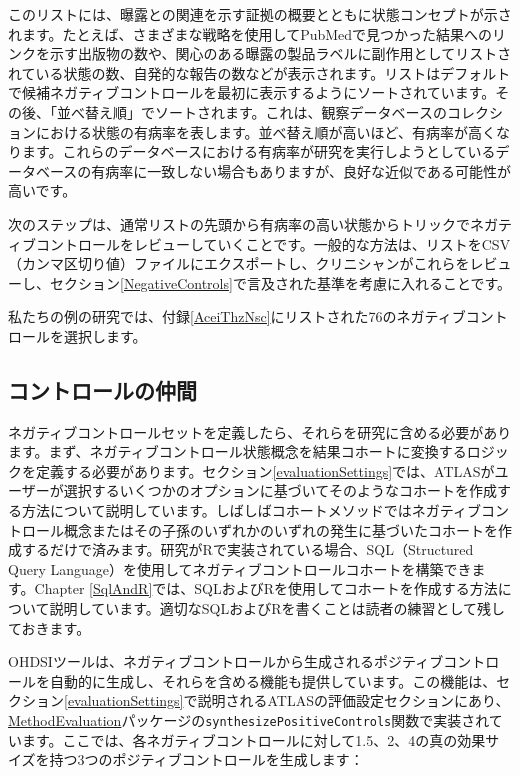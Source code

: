 \documentclass[
  11pt]{book}
\theoremstyle{definition}
\theoremstyle{definition}
\theoremstyle{definition}
\theoremstyle{definition}
\theoremstyle{remark}
\begin{document}
このリストには、曝露との関連を示す証拠の概要とともに状態コンセプトが示されます。たとえば、さまざまな戦略を使用してPubMedで見つかった結果へのリンクを示す出版物の数や、関心のある曝露の製品ラベルに副作用としてリストされている状態の数、自発的な報告の数などが表示されます。リストはデフォルトで候補ネガティブコントロールを最初に表示するようにソートされています。その後、「並べ替え順」でソートされます。これは、観察データベースのコレクションにおける状態の有病率を表します。並べ替え順が高いほど、有病率が高くなります。これらのデータベースにおける有病率が研究を実行しようとしているデータベースの有病率に一致しない場合もありますが、良好な近似である可能性が高いです。

次のステップは、通常リストの先頭から有病率の高い状態からトリックでネガティブコントロールをレビューしていくことです。一般的な方法は、リストをCSV（カンマ区切り値）ファイルにエクスポートし、クリニシャンがこれらをレビューし、セクション\ref{NegativeControls}で言及された基準を考慮に入れることです。

私たちの例の研究では、付録\ref{AceiThzNsc}にリストされた76のネガティブコントロールを選択します。

\subsection{コントロールの仲間}\label{ux30b3ux30f3ux30c8ux30edux30fcux30ebux306eux4ef2ux9593}

ネガティブコントロールセットを定義したら、それらを研究に含める必要があります。まず、ネガティブコントロール状態概念を結果コホートに変換するロジックを定義する必要があります。セクション\ref{evaluationSettings}では、ATLASがユーザーが選択するいくつかのオプションに基づいてそのようなコホートを作成する方法について説明しています。しばしばコホートメソッドではネガティブコントロール概念またはその子孫のいずれかのいずれの発生に基づいたコホートを作成するだけで済みます。研究がRで実装されている場合、SQL（Structured Query Language）を使用してネガティブコントロールコホートを構築できます。Chapter \ref{SqlAndR}では、SQLおよびRを使用してコホートを作成する方法について説明しています。適切なSQLおよびRを書くことは読者の練習として残しておきます。

OHDSIツールは、ネガティブコントロールから生成されるポジティブコントロールを自動的に生成し、それらを含める機能も提供しています。この機能は、セクション\ref{evaluationSettings}で説明されるATLASの評価設定セクションにあり、\href{https://ohdsi.github.io/MethodEvaluation/}{MethodEvaluation}パッケージの\texttt{synthesizePositiveControls}関数で実装されています。ここでは、各ネガティブコントロールに対して1.5、2、4の真の効果サイズを持つ3つのポジティブコントロールを生成します：
\end{document}
